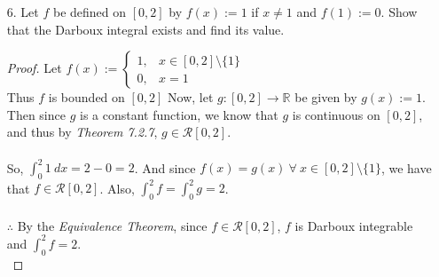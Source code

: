 \documentclass[12pt,letterpaper]{article}
\newcommand{\R}{\mathbb{R}}
\theoremstyle{case}
\theoremstyle{definition}
\begin{document}
\begin{enumerate}
\begin{enumerate}
			\begin{proof}
				Let $f,g,h:[a,b] \to \R$ be bounded functions such that $f(x) \leq g(x) \leq h(x)\ \forall\ x \in [a,b]$, and suppose $f$ and $h$ are both Darboux integrable, and $\displaystyle\int_{a}^{b} f = \displaystyle\int_{a}^{b} h$. We want to show that $g$ is also Darboux integrable and that $\displaystyle\int_{a}^{b} g = \displaystyle\int_{a}^{b} f$.
				\\\\Since $f$ and $h$ are Darboux integrable, we know that $U(f)=L(f)$ and $U(h)=L(h)$. Thus by the theorem posed in \textit{Problem 3}, we know that $U(f) \leq U(h)$ and $L(f) \leq L(h)$. We also know that $L(f)=U(f)=\displaystyle\int_{a}^{b} f$ and that $L(h)=U(h)=\displaystyle\int_{a}^{b} h=\int_{a}^{b} f$.\\\\
				Again, by \textit{Problem 3}, we have that $L(f) \leq L(g) \leq L(h)$ and $U(f) \leq U(g) \leq U(h)$. Thus we have that $\displaystyle\int_{a}^{b} f \leq L(g) \leq \int_{a}^{b} f$ and $\displaystyle\int_{a}^{b} f \leq U(g) \leq \int_{a}^{b} f$, which thus yields that $L(g) = \int_{a}^{b} f$, and that $U(g) =\int_{a}^{b} f$. Hence $L(g)=U(g)=\displaystyle\int_{a}^{b} f$.
				\\\\$\therefore$ $g$ is Darboux integrable and $\displaystyle\int_{a}^{b} g = \int_{a}^{b} f$.
			\end{proof}
			\item[6.] Let $f$ be defined on $[0,2]$ by $f(x):=1$ if $x \neq 1$ and $f(1) := 0$. Show that the Darboux integral exists and find its value.
			\begin{proof}
				Let $f(x):=\begin{cases}
				1, &x \in [0,2]\setminus\{1\} \\
				0, &x=1
				\end{cases}$
				\\Thus $f$ is bounded on $[0,2]$ Now, let $g:[0,2] \to \R$ be given by $g(x):=1$. Then since $g$ is a constant function, we know that $g$ is continuous on $[0,2]$, and thus by \textit{Theorem 7.2.7}, $g \in \mathcal{R}[0,2]$.
				\\\\So, $\displaystyle\int_{0}^{2} 1\ dx= 2-0=2$. And since $f(x)=g(x)\ \forall\ x \in [0,2]\setminus\{1\}$, we have that $f \in \mathcal{R}[0,2]$. Also, $\displaystyle\int_{0}^{2} f=\int_{0}^{2} g=2$.
				\\\\$\therefore$ By the \textit{Equivalence Theorem}, since $f\in\mathcal{R}[0,2]$, $f$ is Darboux integrable and $\displaystyle\int_{0}^{2} f =2$.\\

\end{proof}
\end{enumerate}
\end{enumerate}
\end{document}
